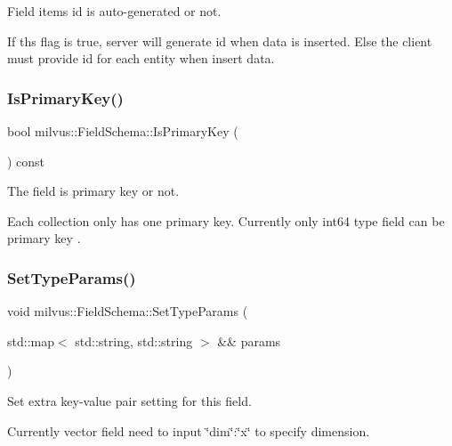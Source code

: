Field item\textquotesingle{}s id is auto-\/generated or not. 

If ths flag is true, server will generate id when data is inserted. Else the client must provide id for each entity when insert data. \mbox{\label{classmilvus_1_1_field_schema_a5f0f254379db440e1acfc18b61f35fa3}} 
\subsubsection{\texorpdfstring{Is\+Primary\+Key()}{IsPrimaryKey()}}
{\footnotesize\ttfamily bool milvus\+::\+Field\+Schema\+::\+Is\+Primary\+Key (\begin{DoxyParamCaption}{ }\end{DoxyParamCaption}) const\hspace{0.3cm}{\ttfamily [inline]}}



The field is primary key or not. 

Each collection only has one primary key. Currently only int64 type field can be primary key . \mbox{\label{classmilvus_1_1_field_schema_a2e85d1229a2a1a84f9771bab95d4b471}} 
\subsubsection{\texorpdfstring{Set\+Type\+Params()}{SetTypeParams()}}
{\footnotesize\ttfamily void milvus\+::\+Field\+Schema\+::\+Set\+Type\+Params (\begin{DoxyParamCaption}\item[{std\+::map$<$ std\+::string, std\+::string $>$ \&\&}]{params }\end{DoxyParamCaption})\hspace{0.3cm}{\ttfamily [inline]}}



Set extra key-\/value pair setting for this field. 

Currently vector field need to input \char`\"{}dim\char`\"{}\+:\char`\"{}x\char`\"{} to specify dimension. \mbox{\label{classmilvus_1_1_field_schema_aabcec133858a09803bed5647a2cb2421}} 
